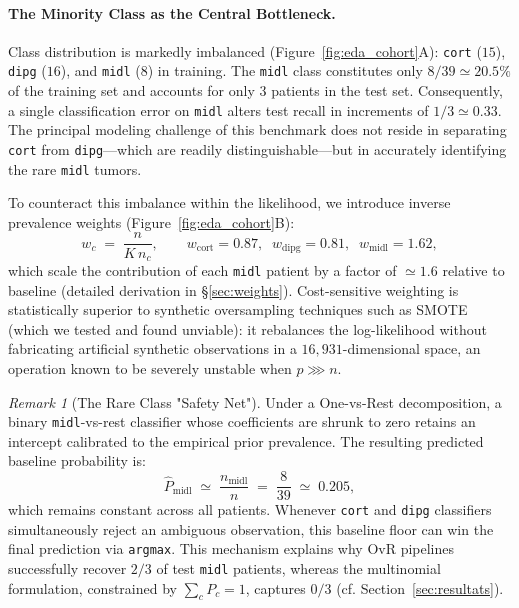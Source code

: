 \documentclass[a4paper,11pt]{paper}
\theoremstyle{plain}
\theoremstyle{definition}
\theoremstyle{remark}
\newtheorem{remark}[theorem]{Remark}
\begin{document}
\paragraph{The Minority Class as the Central Bottleneck.}
Class distribution is markedly imbalanced (Figure~\ref{fig:eda_cohort}A): \texttt{cort} ($15$), \texttt{dipg} ($16$), and \texttt{midl} ($8$) in training. The \texttt{midl} class constitutes only $8/39 \simeq 20.5\%$ of the training set and accounts for only $3$ patients in the test set. Consequently, a single classification error on \texttt{midl} alters test recall in increments of $1/3 \simeq 0.33$. The principal modeling challenge of this benchmark does not reside in separating \texttt{cort} from \texttt{dipg}---which are readily distinguishable---but in accurately identifying the rare \texttt{midl} tumors.

To counteract this imbalance within the likelihood, we introduce inverse prevalence weights (Figure~\ref{fig:eda_cohort}B):
$$
    w_c \;=\; \frac{n}{K\, n_c}, \qquad
    w_{\text{cort}} = 0.87,\;\; w_{\text{dipg}} = 0.81,\;\; w_{\text{midl}} = 1.62,
$$
which scale the contribution of each \texttt{midl} patient by a factor of $\simeq 1.6$ relative to baseline (detailed derivation in §\ref{sec:weights}). Cost-sensitive weighting is statistically superior to synthetic oversampling techniques such as SMOTE (which we tested and found unviable): it rebalances the log-likelihood without fabricating artificial synthetic observations in a $16{,}931$-dimensional space, an operation known to be severely unstable when $p \ggg n$.

\begin{remark}[The Rare Class "Safety Net"]
    Under a One-vs-Rest decomposition, a binary \texttt{midl}-vs-rest classifier whose coefficients are shrunk to zero retains an intercept calibrated to the empirical prior prevalence. The resulting predicted baseline probability is:
    $$
        \hat P_{\text{midl}} \;\simeq\; \frac{n_{\text{midl}}}{n} \;=\; \frac{8}{39} \;\simeq\; 0.205,
    $$
    which remains constant across all patients. Whenever \texttt{cort} and \texttt{dipg} classifiers simultaneously reject an ambiguous observation, this baseline floor can win the final prediction via \texttt{argmax}. This mechanism explains why OvR pipelines successfully recover $2/3$ of test \texttt{midl} patients, whereas the multinomial formulation, constrained by $\sum_c P_c = 1$, captures $0/3$ (cf. Section~\ref{sec:resultats}).
\end{remark}
\end{document}
